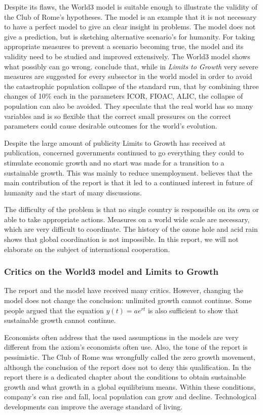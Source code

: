 \documentclass[10pt,a4paper]{scrartcl}
\begin{document}
Despite its flaws, the World3 model is suitable enough to illustrate the validity of the Club of Rome's hypotheses. The model is an example that it is not necessary to have a perfect model to give an clear insight in problems. The model does not give a prediction, but is sketching alternative scenario's for humanity. For taking appropriate measures to prevent a scenario becoming true, the model and its validity need to be studied and improved extensively. The World3 model shows what possibly can go wrong. \cite{vermeulen1976parameter} conclude that, while in \emph{Limits to Growth} very severe measures are suggested for every subsector in the world model in order to avoid the catastrophic population collapse of the standard run, that by combining three changes of 10\% each in the parameters ICOR, FIOAC, ALIC, the collapse of population can also be avoided. They speculate that the real world has so many variables and is so flexible that the correct small pressures on the correct parameters could cause desirable outcomes for the world's evolution.

Despite the large amount of publicity Limits to Growth has received at publication, concerned governments continued to go everything they could to stimulate economic growth and no start was made for a transition to a sustainable growth. This was mainly to reduce unemployment. \cite{voorbijdegrenzen} believes that the main contribution of the report is that it led to a continued interest in future of humanity and the start of many discussions.

The difficulty of the problem is that no single country is responsible on its own or able to take appropriate actions. Measures on a world wide scale are necessary, which are very difficult to coordinate. The history of the ozone hole and acid rain shows that global coordination is not impossible. In this report, we will not elaborate on the subject of international cooperation.

\subsubsection*{Critics on the World3 model and Limits to Growth}

The report and the model have received many critics. However, changing the model does not change the conclusion: unlimited growth cannot continue. Some people argued that the equation $y(t) = ae^{rt}$ is also sufficient to show that sustainable growth cannot continue.

Economists often address that the used assumptions in the models are very different from the axiom's economists often use. Also, the tone of the report is pessimistic. The Club of Rome was wrongfully called the zero growth movement, although the conclusion of the report does not to deny this qualification. In the report there is a dedicated chapter about the conditions to obtain sustainable growth and what growth in a global equilibrium means. Within these conditions, company's can rise and fall, local population can grow and decline. Technological developments can improve the average standard of living.
\end{document}
